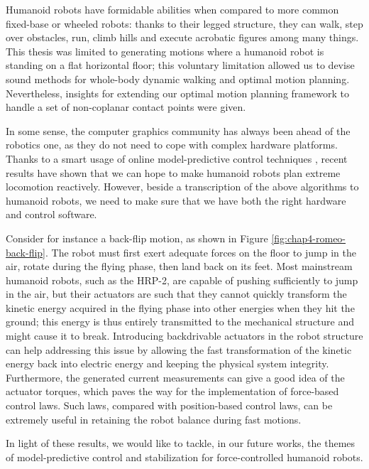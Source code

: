 Humanoid robots have formidable abilities when compared to more common
fixed-base or wheeled robots: thanks to their legged structure, they
can walk, step over obstacles, run, climb hills and execute acrobatic
figures among many things. This thesis was limited to generating
motions where a humanoid robot is standing on a flat horizontal floor;
this voluntary limitation allowed us to devise sound methods for
whole-body dynamic walking and optimal motion planning. Nevertheless,
insights for extending our optimal motion planning framework to handle
a set of non-coplanar contact points were given.

\bigskip

In some sense, the computer graphics community has always been ahead
of the robotics one, as they do not need to cope with complex hardware
platforms. Thanks to a smart usage of online model-predictive control
techniques \cite{coros2010generalized,tassa2012synthesis}, recent
results have shown that we can hope to make humanoid robots plan
extreme locomotion reactively. However, beside a transcription of the
above algorithms to humanoid robots, we need to make sure that we have
both the right hardware and control software.

Consider for instance a back-flip motion, as shown in Figure
\ref{fig:chap4-romeo-back-flip}. The robot must first exert adequate
forces on the floor to jump in the air, rotate during the flying
phase, then land back on its feet. Most mainstream humanoid robots,
such as the HRP-2, are capable of pushing sufficiently to jump in the
air, but their actuators are such that they cannot quickly transform
the kinetic energy acquired in the flying phase into other energies
when they hit the ground; this energy is thus entirely transmitted to
the mechanical structure and might cause it to break. Introducing
backdrivable actuators in the robot structure can help addressing this
issue by allowing the fast transformation of the kinetic energy back
into electric energy and keeping the physical system
integrity. Furthermore, the generated current measurements can give a
good idea of the actuator torques, which paves the way for the
implementation of force-based control laws. Such laws, compared with
position-based control laws, can be extremely useful in retaining the
robot balance during fast motions.

\bigskip

In light of these results, we would like to tackle, in our future
works, the themes of model-predictive control and stabilization for
force-controlled humanoid robots.

